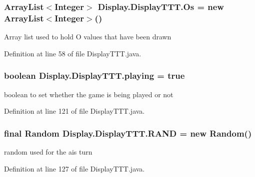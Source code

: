 \subsubsection[{Os}]{\setlength{\rightskip}{0pt plus 5cm}Array\+List$<$Integer$>$ Display.\+Display\+T\+T\+T.\+Os = new Array\+List$<$Integer$>$()\hspace{0.3cm}{\ttfamily [private]}}\label{class_display_1_1_display_t_t_t_a06c277ab266ff9c323c13e1fd50299d2}
Array list used to hold O values that have been drawn 

Definition at line 58 of file Display\+T\+T\+T.\+java.

\hypertarget{class_display_1_1_display_t_t_t_abea0091c8be45438d7be31081d6b8bc3}{}
\subsubsection[{playing}]{\setlength{\rightskip}{0pt plus 5cm}boolean Display.\+Display\+T\+T\+T.\+playing = true\hspace{0.3cm}{\ttfamily [private]}}\label{class_display_1_1_display_t_t_t_abea0091c8be45438d7be31081d6b8bc3}
boolean to set whether the game is being played or not 

Definition at line 121 of file Display\+T\+T\+T.\+java.

\hypertarget{class_display_1_1_display_t_t_t_a532c82249100ab477c093e5202b42415}{}
\subsubsection[{R\+A\+N\+D}]{\setlength{\rightskip}{0pt plus 5cm}final Random Display.\+Display\+T\+T\+T.\+R\+A\+N\+D = new Random()\hspace{0.3cm}{\ttfamily [private]}}\label{class_display_1_1_display_t_t_t_a532c82249100ab477c093e5202b42415}
random used for the ai\textquotesingle{}s turn 

Definition at line 127 of file Display\+T\+T\+T.\+java.

\hypertarget{class_display_1_1_display_t_t_t_a30415017d1d80126ca6295a1d711684d}{}
